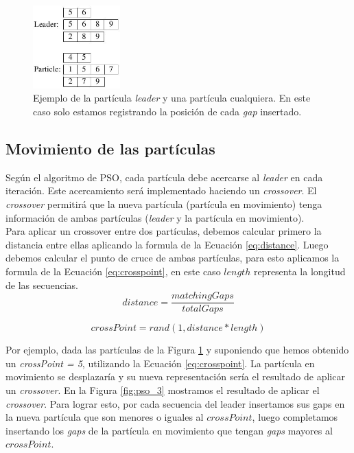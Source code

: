 \documentclass{cup-pan}
\begin{document}
	\begin{figure}[h]
		\centering
		\includegraphics[width=0.3\textwidth]{images/pso_2}
		\caption{Ejemplo de la partícula \textit{leader} y una partícula cualquiera. En este caso solo estamos registrando la posición de cada \textit{gap } insertado.}
		\label{fig:pso_2}
	\end{figure}
	
	\subsection{Movimiento de las partículas}
	Según el algoritmo de PSO, cada partícula debe acercarse al \textit{leader} en cada iteración. Este acercamiento será implementado haciendo un \textit{crossover}. El \textit{crossover} permitirá que la nueva partícula (partícula en movimiento) tenga información de ambas partículas (\textit{leader} y la partícula en movimiento).  \\
	
	Para aplicar un crossover entre dos partículas, debemos calcular primero la distancia entre ellas aplicando la formula de la Ecuación \ref{eq:distance}. Luego debemos calcular el punto de cruce de ambas partículas, para esto aplicamos la formula de la Ecuación \ref{eq:crosspoint}, en este caso $length$ representa la longitud de las secuencias.\\
	
	
	
	\begin{equation}\label{eq:distance}
		distance =  \dfrac{ matchingGaps }{totalGaps} 
	\end{equation}
	
	\begin{equation}\label{eq:crosspoint}
	crossPoint =  rand( 1, distance*length )
	\end{equation}

	Por ejemplo, dada las partículas de la Figura \ref{fig:pso_2} y suponiendo que hemos obtenido un \textit{crossPoint = 5},  utilizando la Ecuación \ref{eq:crosspoint}. La partícula en movimiento se desplazaría y su nueva representación sería el resultado de aplicar un \textit{crossover}. En la Figura \ref{fig:pso_3} mostramos el resultado de aplicar el \textit{crossover}. Para lograr esto, por cada secuencia del leader insertamos sus gaps en la nueva partícula que son menores o iguales al $crossPoint$, luego completamos insertando los \textit{gaps} de la partícula en movimiento que tengan \textit{gaps} mayores al $crossPoint$.
	
\end{document}
